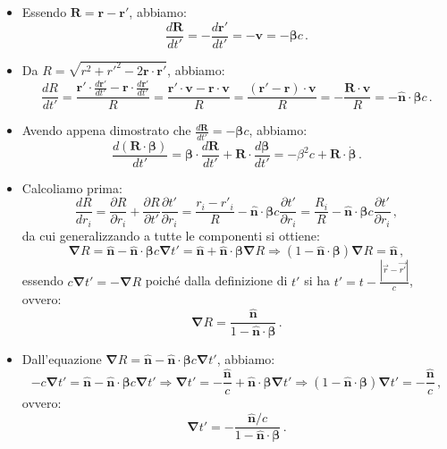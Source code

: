 \documentclass[twoside]{article}
\begin{document}
\begin{itemize}
\item Essendo $\mathbf{R}=\mathbf{r}-\mathbf{r'}$, abbiamo:
\begin{equation*}
\frac{d\mathbf{R}}{dt'}=-\frac{d\mathbf{r'}}{dt'}=-\mathbf{v}=-\bm{\beta}c \, .
\end{equation*}
\item Da $R=\sqrt{r^2+r'^2-2\mathbf{r}\cdot\mathbf{r'}}$, abbiamo:
\begin{equation*}
\frac{dR}{dt'}=\frac{\mathbf{r'}\cdot \frac{d\mathbf{r'}}{dt'}-\mathbf{r}\cdot\frac{d\mathbf{r'}}{dt'}}{R}=\frac{\mathbf{r'}\cdot\mathbf{v}-\mathbf{r}\cdot\mathbf{v}}{R}=\frac{(\mathbf{r'}-\mathbf{r})\cdot\mathbf{v}}{R}=-\frac{\mathbf{R}\cdot\mathbf{v}}{R}=-\mathbf{\hat{n}}\cdot\bm{\beta}c \, .
\end{equation*} 
\item Avendo appena dimostrato che $\frac{d\mathbf{R}}{dt'}=-\bm{\beta}c$, abbiamo:
\begin{equation*}
\frac{d(\mathbf{R}\cdot\bm{\beta})}{dt'}=\bm{\beta}\cdot\frac{d\mathbf{R}}{dt'}+\mathbf{R}\cdot\frac{d\bm{\beta}}{dt'}=-\beta^2c+\mathbf{R}\cdot\bm{\dot{\beta}} \, .
\end{equation*}
\item Calcoliamo prima:
\begin{equation*}
\frac{dR}{dr_i}=\frac{\partial R}{\partial r_i}+\frac{\partial R}{\partial t'}\frac{\partial t'}{\partial r_i}=\frac{r_i-r'_i}{R}-\mathbf{\hat{n}}\cdot\bm{\beta}c\frac{\partial t'}{\partial r_i}=\frac{R_i}{R}-\mathbf{\hat{n}}\cdot\bm{\beta}c\frac{\partial t'}{\partial r_i} \, ,
\end{equation*}
da cui generalizzando a tutte le componenti si ottiene:
\begin{equation*}
\mathbf{\nabla}R=\mathbf{\hat{n}}-\mathbf{\hat{n}}\cdot\bm{\beta}c\mathbf{\nabla}t'=\mathbf{\hat{n}}+\mathbf{\hat{n}}\cdot\bm{\beta}\mathbf{\nabla}R \Rightarrow (1-\mathbf{\hat{n}}\cdot\bm{\beta})\mathbf{\nabla}R=\mathbf{\hat{n}} \, ,
\end{equation*}
essendo $c\mathbf{\nabla}t'=-\mathbf{\nabla}R$ poiché dalla definizione di $t'$ si ha $t'= t- \frac{|\vec{r}-\vec{r'}|}{c}$, ovvero:
\begin{equation*}
\mathbf{\nabla}R=\frac{\mathbf{\hat{n}}}{1-\mathbf{\hat{n}}\cdot\bm{\beta}} \, .
\end{equation*}
\item Dall'equazione $\mathbf{\nabla}R=\mathbf{\hat{n}}-\mathbf{\hat{n}}\cdot\bm{\beta}c\mathbf{\nabla}t'$, abbiamo:
\begin{equation*}
-c\mathbf{\nabla}t'=\mathbf{\hat{n}}-\mathbf{\hat{n}}\cdot\bm{\beta}c\mathbf{\nabla}t' \Rightarrow \mathbf{\nabla}t'=-\frac{\mathbf{\hat{n}}}{c}+\mathbf{\hat{n}}\cdot\bm{\beta}\mathbf{\nabla}t' \Rightarrow (1-\mathbf{\hat{n}}\cdot\bm{\beta})\mathbf{\nabla}t'=-\frac{\mathbf{\hat{n}}}{c} \, ,
\end{equation*}
ovvero:
\begin{equation*}
\mathbf{\nabla}t'=-\frac{\mathbf{\hat{n}}/c}{1-\mathbf{\hat{n}}\cdot\bm{\beta}} \, .
\end{equation*}
\end{itemize}
\end{document}
